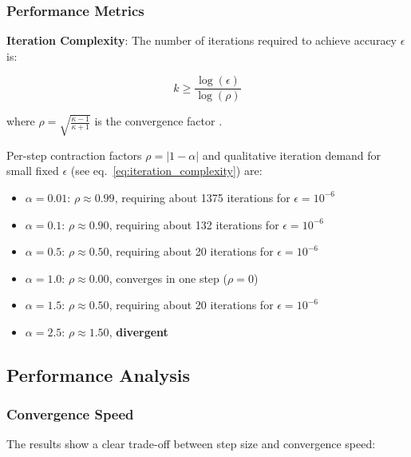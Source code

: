 \documentclass[
  english,
]{article}
\providecommand{\tightlist}{%
  \setlength{\itemsep}{0pt}\setlength{\parskip}{0pt}}
\begin{document}
\subsubsection{Performance Metrics}\label{performance-metrics}

\textbf{Iteration Complexity}: The number of iterations required to
achieve accuracy \(\epsilon\) is:

\begin{equation}
\label{eq:iteration_complexity}
k \geq \frac{\log(\epsilon)}{\log(\rho)}
\end{equation}

where \(\rho = \sqrt{\frac{\kappa - 1}{\kappa + 1}}\) is the convergence
factor \citep{polyak1964some}.

Per-step contraction factors \(\rho = |1-\alpha|\) and qualitative
iteration demand for small fixed \(\epsilon\) (see
eq.~\ref{eq:iteration_complexity}) are:

\begin{itemize}
\tightlist
\item
  \(\alpha = 0.01\): \(\rho \approx 0.99\), requiring
  about 1375 iterations for \(\epsilon = 10^{-6}\)
\item
  \(\alpha = 0.1\): \(\rho \approx 0.90\), requiring about 132
  iterations for \(\epsilon = 10^{-6}\)
\item
  \(\alpha = 0.5\): \(\rho \approx 0.50\), requiring about 20
  iterations for \(\epsilon = 10^{-6}\)
\item
  \(\alpha = 1.0\): \(\rho \approx 0.00\), converges in one step
  (\(\rho = 0\))
\item
  \(\alpha = 1.5\): \(\rho \approx 0.50\), requiring about 20
  iterations for \(\epsilon = 10^{-6}\)
\item
  \(\alpha = 2.5\): \(\rho \approx 1.50\), \textbf{divergent}
\end{itemize}

\subsection{Performance Analysis}\label{performance-analysis}

\subsubsection{Convergence Speed}\label{convergence-speed}

The results show a clear trade-off between step size and convergence
speed:
\end{document}
